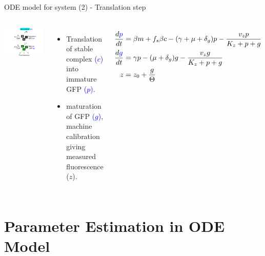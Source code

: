 \documentclass{beamer}
\begin{document}
\begin{frame}{ODE model for system (2) - Translation step}
\begin{columns}
\includegraphics[trim = 0 0 0 0,clip = true,scale = 0.31]{Figures/schematic_translation}
  \begin{itemize}
    \item Translation of stable complex \textcolor{blue}{($c$)} into immature GFP \textcolor{blue}{($p$)}. 
    \item maturation of GFP \textcolor{blue}{($g$)}, machine calibration giving measured fluorescence ($z$).
    \end{itemize}
\footnotesize
\begin{align*} 
\frac{d\textcolor{blue}{p}}{dt} & = \beta m +f_{s}\beta c -(\gamma + \mu + \delta_{g})p - \frac{v_{z}p}{K_{z}+p+g}   \\
\frac{d\textcolor{blue}{g}}{dt} & = \gamma p - (\mu + \delta_{g})g - \frac{v_{z}g}{K_{z}+p+g} \\
z &= z_{0} +\frac{g}{\Theta} 
\end{align*}
\end{columns}
\end{frame}

\section{Parameter Estimation in ODE Model}
\end{document}
